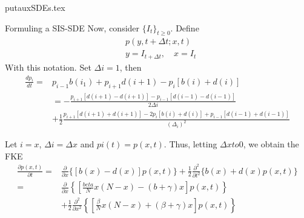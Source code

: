 put{auxSDEs.tex}
    \begin{frame}{Formuling a SIS-SDE}
        Now, consider $\{I_t\}_{t \geq 0}$. Define
        \begin{align*} 
            & p(y, t + \Delta t; x ,t)
            \\
            & y = I_{t + \Delta t},
            \quad x =I_t
        \end{align*}
              With this notation. Set $\Delta i = 1$, then
        \begin{align*}
            \frac{d p_i}{dt} 
                =&
                p_{i -1} b(i_1) + p_{i + 1} d(i + 1)
                - p_i [ b(i) + d(i)]
            \\
                &=
                - \frac{
                    p_{i + 1}[d(i + 1) - d(i + 1)]
                    - 
                    p_{i - 1}[d(i -1) - d(i - 1)]
                }{2 \Delta i}
            \\
                & +
                \frac{1}{2}
                \frac{
                    p_{i + 1}[d(i + 1) + d(i + 1)]
                    -
                    2 p_i[b(i) + d(i)]
                    +
                    p_{i - 1}[d(i -1) + d(i - 1)]}{
                        (\Delta_i) ^ 2
                    }
        \end{align*}
    \end{frame}
    \begin{frame}{}
            Let $i = x$, $\Delta i = \Delta x$ and $pi(t) = p(x,t)$.
        Thus, letting  $\Delta x to 0$, we obtain the FKE
        \begin{align*} 
            \frac{\partial p(x,t)}{\partial t}
                =&
                    \frac{\partial}{\partial x} \{   
                            [b(x) - d(x)] p(x,t)
                        \}
                +
                    \frac{1}{2}
                        \frac{\partial ^ 2}{\partial t ^ 2} \{
                            b(x)  + d(x) p(x,t) 
                        \}
                \\
                =&
                    \frac{\partial}{\partial x}
                    \left \{
                        \left [
                            \frac{beta}{N}
                            x (N - x)
                            - (b + \gamma) x
                        \right]
                        p(x,t)
                    \right \}
                \\    
                &+
                    \frac{1}{2}
                    \frac{\partial ^ 2}{\partial x ^ 2}
                    \left \{
                        \left [
                            \frac{\beta}{N}
                                x (N -x) + (\beta + \gamma) x 
                        \right ] p(x, t)
                    \right \}
        \end{align*}
    \end{frame}
